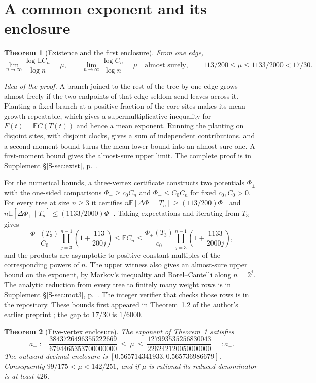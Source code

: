 \documentclass[11pt]{article}
\newtheorem{theorem}{Theorem}
\newcommand{\resulttag}{?}
\newcommand{\tagnext}[1]{\renewcommand{\resulttag}{#1}}
\theoremstyle{remark}
\newcommand{\E}{\mathbb E}
\newcommand{\Sref}[1]{Supplement \S\ref{S-#1}, p.~\pageref{S-#1}}
\begin{document}
\section{A common exponent and its enclosure}\label{sec:exponent}
\tagnext{EXP}
\begin{theorem}[Existence and the first enclosure]\label{th:exist}
From one edge,
\[
 \lim_{n\to\infty}\frac{\log\E C_n}{\log n}=\mu,\qquad
 \lim_{n\to\infty}\frac{\log C_n}{\log n}=\mu\quad\text{almost surely},
 \qquad 113/200\le\mu\le1133/2000<17/30 .
\]
\end{theorem}
\emph{Idea of the proof.} A branch joined to the rest of the tree by one edge grows almost freely if the two endpoints of that edge seldom send leaves across it. Planting a fixed branch at a positive fraction of the core sites makes its mean growth repeatable, which gives a supermultiplicative inequality for $F(t)=\E C(T(t))$ and hence a mean exponent. Running the planting on disjoint sites, with disjoint clocks, gives a sum of independent contributions, and a second-moment bound turns the mean lower bound into an almost-sure one. A first-moment bound gives the almost-sure upper limit. The complete proof is in \Sref{sec:exist}.

For the numerical bounds, a three-vertex certificate constructs two potentials $\Phi_\pm$ with the one-sided comparisons $\Phi_+\ge c_0 C_n$ and $\Phi_-\le C_0 C_n$ for fixed $c_0,C_0>0$. For every tree at size $n\ge3$ it certifies $n\E[\Delta\Phi_-\mid T_n]\ge(113/200)\Phi_-$ and $n\E[\Delta\Phi_+\mid T_n]\le(1133/2000)\Phi_+$. Taking expectations and iterating from $T_3$ gives
\[
 \frac{\Phi_-(T_3)}{C_0}\prod_{j=3}^{n-1}\left(1+\frac{113}{200j}\right)
 \le \E C_n \le
 \frac{\Phi_+(T_3)}{c_0}\prod_{j=3}^{n-1}\left(1+\frac{1133}{2000j}\right),
\]
and the products are asymptotic to positive constant multiples of the corresponding powers of $n$. The upper witness also gives an almost-sure upper bound on the exponent, by Markov's inequality and Borel--Cantelli along $n=2^j$. The analytic reduction from every tree to finitely many weight rows is in \Sref{sec:mot3}. The integer verifier that checks those rows is in the repository. These bounds first appeared in Theorem~1.2 of the author's earlier preprint \cite{UzayFirst}; the gap to $17/30$ is $1/6000$.

\tagnext{ENC}
\begin{theorem}[Five-vertex enclosure]\label{th:gold2}
The exponent of Theorem~\ref{th:exist} satisfies
\[
 a_-:=\frac{3843726496355222669}{6794465353700000000}\ \le\ \mu\ \le\
 \frac{127993535256830043}{226242120050000000}=:a_+ .
\]
The outward decimal enclosure is $[0.565714341933,0.565736986679]$. Consequently $99/175<\mu<142/251$, and if $\mu$ is rational its reduced denominator is at least $426$.
\end{theorem}
\end{document}
